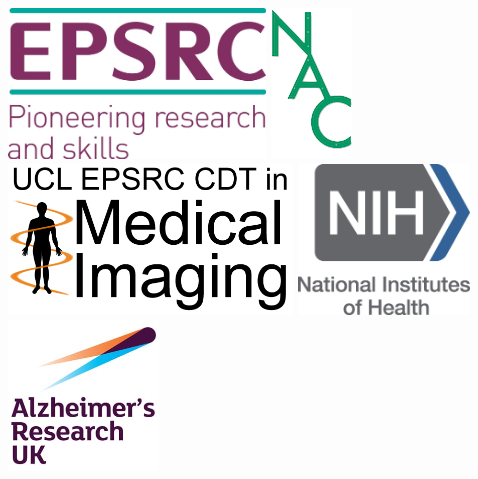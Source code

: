 \documentclass[portrait,a0,final,20pt]{a0poster}
\begin{document}
\begin{multicols}{2}
\vspace{1em}
\includegraphics[height=4.0cm]{epsrc_logo}
\hspace{0.5em}
\includegraphics[height=4cm]{nac_logo} 
\hspace{0.5em}
\includegraphics[height=4cm]{cdt_logo} 
\hspace{0.5em}
\includegraphics[height=4cm]{nih_logo} 
\hspace{0.5em}
\includegraphics[height=4cm]{aruk_logo} 
\hspace{0.5em}


\end{multicols}
\end{document}
